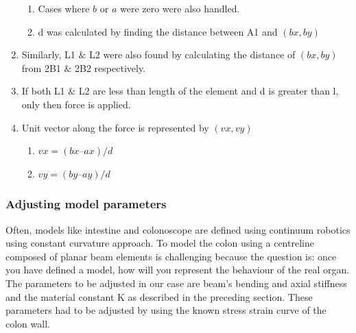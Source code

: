 \documentclass[12pt]{report}
\begin{document}
\begin{enumerate}
\begin{enumerate}
	\item Cases where  \( b \)  or  \( a \)  were zero were also handled.\par

	\item d was calculated by finding the distance between A1 and  \(  \left( bx, by \right)  \) \par


\end{enumerate}
	\item Similarly, L1 $\&$  L2 were also found by calculating the distance of  \(  \left( bx, by \right)  \)  from 2B1 $\&$  2B2 respectively.\par

	\item If both L1 $\&$  L2 are less than length of the element and d is greater than l, only then force is applied.\par

	\item Unit vector along the force is represented by  \(  \left( vx,vy \right)  \) \par

\begin{enumerate}
	\item  \( vx =  \left( bx – ax \right) /d \) \par

	\item  \( vy =  \left( by – ay \right) /d \) 
\end{enumerate}
\end{enumerate}\par

\subsubsection*{Adjusting model parameters}
Often, models like intestine and colonoscope are defined using continuum robotics using constant curvature approach. To model the colon using a centreline composed of planar beam elements is challenging because the question is: once you have defined a model, how will you represent the behaviour of the real organ. The parameters to be adjusted in our case are beam’s bending and axial stiffness and the material constant K as described in the preceding section. These parameters had to be adjusted by using the known stress strain curve of the colon wall.\par
\end{document}
